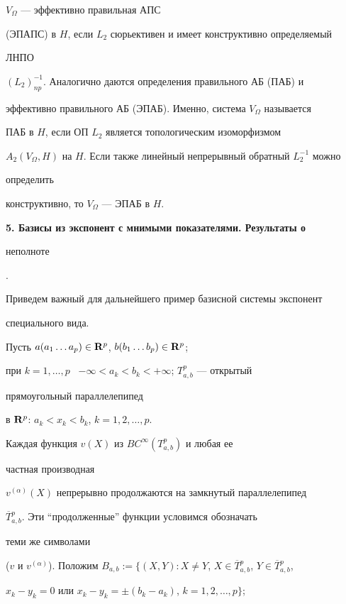 $V_{\Omega}$ --- эффективно правильная АПС


(ЭПАПС) в $H$, если $L_2$ сюрьективен и имеет конструктивно определяемый


ЛНПО


$(L_2)^{-1}_{np}$. Аналогично даются определения правильного АБ (ПАБ) и


эффективно правильного АБ (ЭПАБ). Именно, система $V_{\Omega}$ называется


ПАБ в $H$, если ОП $L_2$ является топологическим изоморфизмом


$A_2(V_{\Omega},


H)$ на $H$. Если также линейный непрерывный обратный $L_2^{-1}$ можно


определить


конструктивно, то $V_{\Omega}$ --- ЭПАБ в $H$.


\medskip





{\bf 5. Базисы из экспонент с мнимыми показателями. Результаты о


неполноте}.


Приведем важный для дальнейшего пример базисной системы экспонент


специального вида.


Пусть $a(a_1\dotsc a_p)\in {\bold R}^p$, $b(b_1\dotsc b_p)\in {\bold R}^p$;


при $k=1,\dotsc,p$ \ $-\infty<a_k<b_k<+\infty$; $T_{a,b}^p$ --- открытый


прямоугольный параллелепипед


в ${\bold R}^p$: $a_k<x_k<b_k$, $k=1,2,\dotsc, p$.





Каждая функция $v(X)$ из $BC^{\infty}(T^p_{a,b})$ и любая ее


частная производная


$v^{(\alpha)}(X)$ непрерывно продолжаются на замкнутый параллелепипед


$\overline{T}{}^p_{a,b}$. Эти ``продолженные'' функции условимся обозначать 


теми же символами


($v$ и $v^{(\alpha)}$). Положим $B_{a,b}:=\{(X,Y): X\neq Y$, $X\in


\overline{T}{}^p_{a,b}$, $Y\in \overline{T}{}^p_{a,b}$,


$x_k-y_k=0$ или $x_k-y_k=\pm(b_k-a_k)$, $k=1,2,\dotsc, p\}$;


